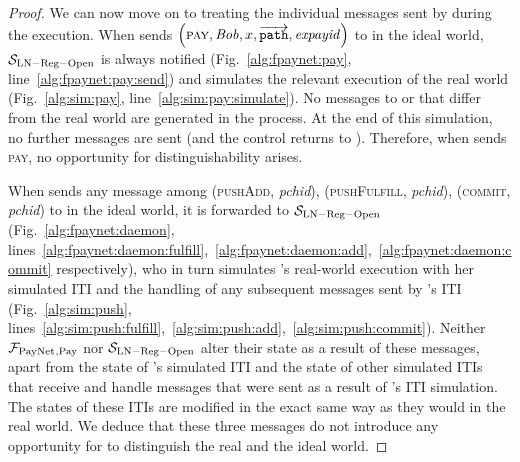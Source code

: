 \begin{proof}
  We can now move on to treating the individual messages sent by \environment{}
  during the execution. When \environment{} sends $\left(\textsc{pay}, \mathit{Bob}, x,
  \overrightarrow{\mathtt{path}}, \mathit{expayid}\right)$ to \alice{}
  in the ideal world, $\mathcal{S}_{\mathrm{LN - Reg - Open}}$ is always notified
  (Fig.~\ref{alg:fpaynet:pay}, line~\ref{alg:fpaynet:pay:send}) and simulates
  the relevant execution of the real world (Fig.~\ref{alg:sim:pay},
  line~\ref{alg:sim:pay:simulate}). No messages to \ledger{} or \environment{}
  that differ from the real world are generated in the process. At the end of
  this simulation, no further messages are sent (and the control returns to
  \environment). Therefore, when \environment{} sends \textsc{pay}, no
  opportunity for distinguishability arises.

  When \environment{} sends any message among (\textsc{pushAdd}, \textit{pchid}),
  (\textsc{pushFulfill}, \textit{pchid}), (\textsc{commit}, \textit{pchid}) to
  \alice{} in the ideal world, it is forwarded to $\mathcal{S}_{\mathrm{LN - Reg
  - Open}}$ (Fig.~\ref{alg:fpaynet:daemon},
  lines~\ref{alg:fpaynet:daemon:fulfill},~\ref{alg:fpaynet:daemon:add},~\ref{alg:fpaynet:daemon:commit}
  respectively), who in turn simulates \alice's real-world execution with her
  simulated ITI and the handling of any subsequent messages sent by \alice's ITI
  (Fig.~\ref{alg:sim:push},
  lines~\ref{alg:sim:push:fulfill},~\ref{alg:sim:push:add},~\ref{alg:sim:push:commit}).
  Neither $\mathcal{F}_{\mathrm{PayNet}}{}_{\mathrm{, Pay}}$ nor $\mathcal{S}_{\mathrm{LN - Reg -
  Open}}$ alter their state as a result of these messages, apart from the state
  of \alice's simulated ITI and the state of other simulated ITIs that receive
  and handle messages that were sent as a result of \alice's ITI simulation. The
  states of these ITIs are modified in the exact same way as they would in the
  real world. We deduce that these three messages do not introduce any
  opportunity for \environment{} to distinguish the real and the ideal world.


\end{proof}
